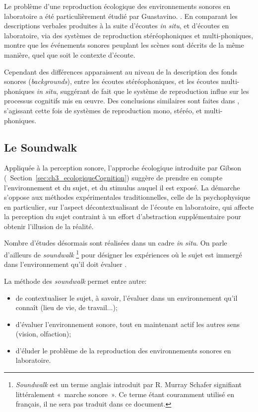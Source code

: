 Le problème d'une reproduction écologique des environnements sonores en laboratoire a été particulièrement étudié par Guastavino. \citep{guastavino2003approche,guastavino2004perceptual,guastavino2005ecological}. En comparant les descriptions verbales produites à la suite d'écoutes \emph{in situ}, et d'écoutes en laboratoire, via des systèmes de reproduction stéréophoniques et multi-phoniques, \citep{guastavino2005ecological} montre que les événements sonores peuplant les scènes sont décrits de la même manière, quel que soit le contexte d'écoute.

Cependant des différences apparaissent au niveau de la description des fonds sonores (\emph{backgrounds}), entre les écoutes stéréophoniques, et les écoutes multi-phoniques \emph{in situ}, suggérant de fait que le système de reproduction influe sur les processus cognitifs mis en œuvre. Des conclusions similaires sont faites dans \citep{guastavino2004perceptual}, s'agissant cette fois de systèmes de reproduction mono, stéréo, et multi-phoniques. 

\subsection{Le Soundwalk}
\label{sec:ch3_soundwalk}

Appliquée à la perception sonore, l'approche écologique introduite par Gibson (\cf~Section~\ref{sec:ch3_ecologiqueCognition}) suggère de prendre en compte l'environnement et du sujet, et du stimulus auquel il est exposé. La démarche s'oppose aux méthodes expérimentales traditionnelles, celle de la psychophysique en particulier, sur l'aspect décontextualisant de l'écoute en laboratoire, qui affecte la perception du sujet contraint à un effort d'abstraction supplémentaire pour obtenir l'illusion de la réalité.

Nombre d'études désormais sont réalisées dans un cadre \emph{in situ}. On parle d'ailleurs de \emph{soundwalk} \footnote{\emph{Soundwalk} est un terme anglais introduit par R. Murray Schafer \citep{schafer1969new} signifiant littéralement «~marche sonore~». Ce terme étant couramment utilisé en français, il ne sera pas traduit dans ce document.} pour désigner les expériences où le sujet est immergé dans l'environnement qu'il doit évaluer \citep{adams2008soundwalking,jeon2013soundwalk}.

La méthode des \emph{soundwalk} permet entre autre:

\begin{itemize}
\item de contextualiser le sujet, à savoir, l'évaluer dans un environnement qu'il connaît (lieu de vie, de travail...);
\item d'évaluer l'environnement sonore, tout en maintenant actif les autres sens (vision, olfaction);
\item d'éluder le problème de la reproduction des environnements sonores en laboratoire.
\end{itemize}

